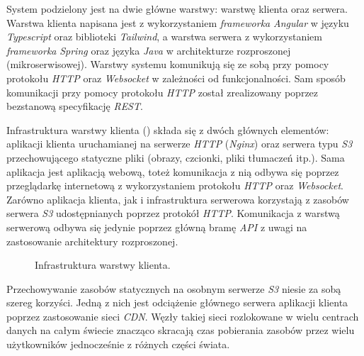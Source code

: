 

System podzielony jest na dwie główne warstwy: warstwę klienta oraz serwera. Warstwa klienta napisana jest z
wykorzystaniem \textit{frameworka} \textit{Angular} w języku \textit{Typescript} oraz biblioteki \textit{Tailwind}, a
warstwa serwera z wykorzystaniem \textit{frameworka} \textit{Spring} oraz języka \textit{Java} w architekturze
rozproszonej (mikroserwisowej). Warstwy systemu komunikują się ze sobą przy pomocy protokołu \textit{HTTP} oraz
\textit{Websocket} w zależności od funkcjonalności. Sam sposób komunikacji przy pomocy protokołu \textit{HTTP} został
zrealizowany poprzez bezstanową specyfikację \textit{REST}.


Infrastruktura warstwy klienta () składa się z dwóch głównych elementów: aplikacji klienta
uruchamianej na serwerze \textit{HTTP} (\textit{Nginx}) oraz serwera typu \textit{S3} przechowującego statyczne pliki
(obrazy, czcionki, pliki tłumaczeń itp.). Sama aplikacja jest aplikacją webową, toteż komunikacja z nią odbywa się
poprzez przeglądarkę internetową z wykorzystaniem protokołu \textit{HTTP} oraz \textit{Websocket}. Zarówno aplikacja
klienta, jak i infrastruktura serwerowa korzystają z zasobów serwera \textit{S3} udostępnianych poprzez protokół
\textit{HTTP}. Komunikacja z warstwą serwerową odbywa się jedynie poprzez główną bramę \textit{API} z uwagi na
zastosowanie architektury rozproszonej.
%
\begin{figure}[H]
  \centering
  \caption{Infrastruktura warstwy klienta.}
  \label{fig:client-infra}
\end{figure}

Przechowywanie zasobów statycznych na osobnym serwerze \textit{S3} niesie za sobą szereg korzyści. Jedną z nich jest
odciążenie głównego serwera aplikacji klienta poprzez zastosowanie sieci \textit{CDN}. Węzły takiej sieci rozlokowane w
wielu centrach danych na całym świecie znacząco skracają czas pobierania zasobów przez wielu użytkowników jednocześnie z
różnych części świata.


